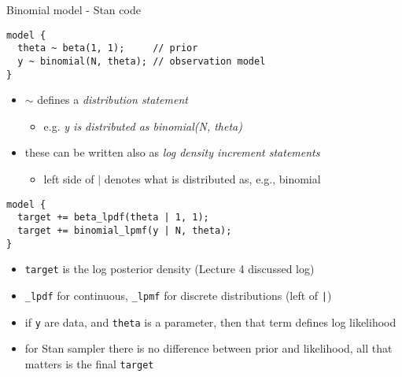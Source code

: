 \documentclass[finnish,english,t]{beamer}
\begin{document}
\begin{frame}[fragile]{Binomial model - Stan code}

  \vspace{-\baselineskip}
  {\small
\begin{verbatim}
model {
  theta ~ beta(1, 1);     // prior
  y ~ binomial(N, theta); // observation model
}
\end{verbatim}
  }

    \vspace{-0.5\baselineskip}
    \begin{itemize}
    \item $\sim$ defines a \textit{distribution statement}
      \begin{itemize}
      \item[] e.g. \textit{y is distributed as binomial(N, theta)}
      \end{itemize}
    \item<2-> these can be written also as \textit{log density increment statements}
      \begin{itemize}
      \item[] left side of $|$ denotes what is distributed as, e.g., binomial
      \end{itemize}
    \end{itemize}

    \pause
    \vspace{-0.5\baselineskip}
  {\small
\begin{verbatim}
model {
  target += beta_lpdf(theta | 1, 1);
  target += binomial_lpmf(y | N, theta);
}
\end{verbatim}
  }

    \vspace{-0.5\baselineskip}
    \begin{itemize}
    \item<3-> {\tt target} is the log posterior density (Lecture 4 discussed log)
    \item<4-> {\tt \_lpdf} for continuous, {\tt \_lpmf} for discrete distributions (left of {\tt |})
    \item<5-> if \texttt{y} are data, and \texttt{theta} is a parameter, then that term defines log likelihood
    \item<6-> for Stan sampler there is no difference between prior and likelihood, all that matters is the final {\tt target}
    \end{itemize}

\end{frame} 
\end{document}
